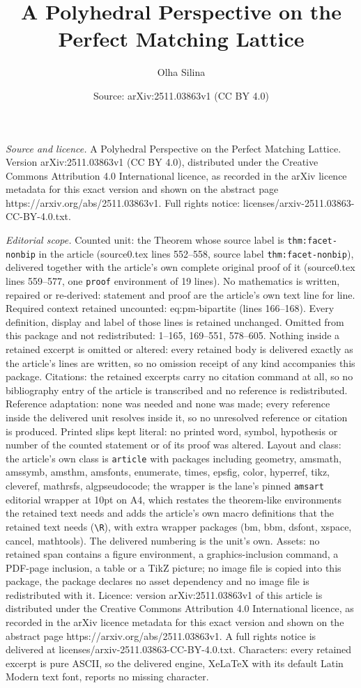 \documentclass[10pt,a4paper]{amsart}
\title[A Polyhedral Perspective on the Perfect Matching Lattice]{A Polyhedral Perspective on the Perfect Matching Lattice}
\author{Olha Silina}
\date{Source: arXiv:2511.03863v1 (CC BY 4.0)}
\begin{document}
\maketitle

\noindent\emph{Source and licence.} A Polyhedral Perspective on the Perfect Matching Lattice. Version arXiv:2511.03863v1 (CC BY 4.0), distributed under the Creative Commons Attribution 4.0 International licence, as recorded in the arXiv licence metadata for this exact version and shown on the abstract page https://arxiv.org/abs/2511.03863v1. Full rights notice: licenses/arxiv-2511.03863-CC-BY-4.0.txt.\par\smallskip

\noindent\textit{Editorial scope.} Counted unit: the Theorem whose source label is \texttt{thm:facet-nonbip} in the article (source0.tex lines 552--558, source label \texttt{thm:facet-nonbip}), delivered together with the article's own complete original proof of it (source0.tex lines 559--577, one \texttt{proof} environment of 19 lines). No mathematics is written, repaired or re-derived: statement and proof are the article's own text line for line. Required context retained uncounted: eq:pm-bipartite (lines 166--168). Every definition, display and label of those lines is retained unchanged. Omitted from this package and not redistributed: 1--165, 169--551, 578--605. Nothing inside a retained excerpt is omitted or altered: every retained body is delivered exactly as the article's lines are written, so no omission receipt of any kind accompanies this package. Citations: the retained excerpts carry no citation command at all, so no bibliography entry of the article is transcribed and no reference is redistributed. Reference adaptation: none was needed and none was made; every reference inside the delivered unit resolves inside it, so no unresolved reference or citation is produced. Printed slips kept literal: no printed word, symbol, hypothesis or number of the counted statement or of its proof was altered. Layout and class: the article's own class is \texttt{article} with packages including geometry, amsmath, amssymb, amsthm, amsfonts, enumerate, times, epsfig, color, hyperref, tikz, cleveref, mathrsfs, algpseudocode; the wrapper is the lane's pinned \texttt{amsart} editorial wrapper at 10pt on A4, which restates the theorem-like environments the retained text needs and adds the article's own macro definitions that the retained text needs (\texttt{\textbackslash R}), with extra wrapper packages (bm, bbm, dsfont, xspace, cancel, mathtools). The delivered numbering is the unit's own. Assets: no retained span contains a figure environment, a graphics-inclusion command, a PDF-page inclusion, a table or a TikZ picture; no image file is copied into this package, the package declares no asset dependency and no image file is redistributed with it. Licence: version arXiv:2511.03863v1 of this article is distributed under the Creative Commons Attribution 4.0 International licence, as recorded in the arXiv licence metadata for this exact version and shown on the abstract page https://arxiv.org/abs/2511.03863v1. A full rights notice is delivered at licenses/arxiv-2511.03863-CC-BY-4.0.txt. Characters: every retained excerpt is pure ASCII, so the delivered engine, XeLaTeX with its default Latin Modern text font, reports no missing character.
\end{document}
